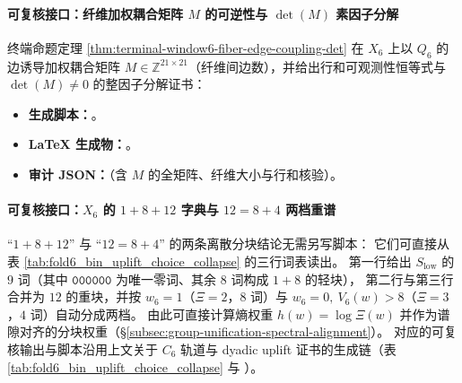 \paragraph{可复核接口：纤维加权耦合矩阵 \(M\) 的可逆性与 \texorpdfstring{$\det(M)$}{det(M)} 素因子分解}
终端命题定理 \ref{thm:terminal-window6-fiber-edge-coupling-det} 在 \(X_6\) 上以 \(Q_6\) 的边诱导加权耦合矩阵 \(M\in\mathbb{Z}^{21\times 21}\)（纤维间边数），并给出行和可观测性恒等式与 \(\det(M)\neq 0\) 的整因子分解证书：
\begin{itemize}
  \item \textbf{生成脚本：}\texttt{}。
  \item \textbf{LaTeX 生成物：}\texttt{}。
  \item \textbf{审计 JSON：}\texttt{}（含 \(M\) 的全矩阵、纤维大小与行和核验）。
\end{itemize}

\paragraph{可复核接口：\texorpdfstring{$X_6$}{X6} 的 \(1+8+12\) 字典与 \(12=8+4\) 两档重谱}
“\(1+8+12\)” 与 “\(12=8+4\)” 的两条离散分块结论无需另写脚本：
它们可直接从表 \ref{tab:fold6_bin_uplift_choice_collapse} 的三行词表读出。
第一行给出 \(S_{\mathrm{low}}\) 的 \(9\) 词（其中 \(\texttt{000000}\) 为唯一零词、其余 \(8\) 词构成 \(1+8\) 的轻块），
第二行与第三行合并为 \(12\) 的重块，并按 \(w_6=1\)（\(\Xi=2\)，\(8\) 词）与 \(w_6=0,\ V_6(w)>8\)（\(\Xi=3\)，\(4\) 词）自动分成两档。
由此可直接计算熵权重 \(h(w)=\log\Xi(w)\) 并作为谱隙对齐的分块权重（\S\ref{subsec:group-unification-spectral-alignment}）。
对应的可复核输出与脚本沿用上文关于 \(C_6\) 轨道与 dyadic uplift 证书的生成链（表 \ref{tab:fold6_bin_uplift_choice_collapse} 与
\texttt{}）。

